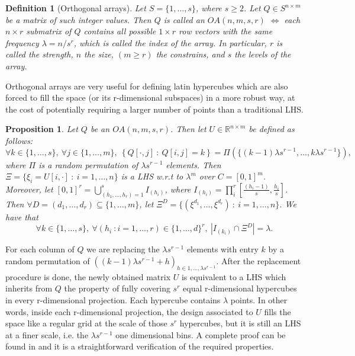 \documentclass{article}
\newtheorem{definition}[theorem]{Definition}
\newtheorem{proposition}[theorem]{Proposition}
\begin{document}
\begin{definition}[Orthogonal arrays]
Let $S=\{1,\dots,s\}$, where $s\ge 2$. Let $Q\in S^{n\times m}$ be a matrix of such integer values. Then $Q$ is called an $OA(n,m,s,r)$ $\Longleftrightarrow$ each $n\times r$ submatrix of $Q$ contains all possible $1\times r$ row vectors with the same frequency $\lambda=n/s^r$, which is called the index of the array. In particular, $r$ is called the strength, $n$ the size, $(m\ge r)$ the constrains, and $s$ the levels of the array.
\end{definition}

Orthogonal arrays are very useful for defining latin hypercubes which are also forced to fill the space (or its r-dimensional subspaces) in a more robust way, at the cost of potentially requiring a larger number of points than a traditional LHS.

\begin{proposition}
Let $Q$ be an $OA(n,m,s,r)$. Then let $U\in\mathbb R^{n\times m}$ be defined as follows:
$$\forall k\in \{1,\dots,s\},\ \forall j\in \{1,\dots,m\},\ \left\{Q[\cdot,j]\ :\ Q[i,j]=k\right\} = \Pi\left(\{(k-1)\lambda s^{r-1},\dots, k\lambda s^{r-1}\}\right),$$
where $\Pi$ is a random permutation of $\lambda s^{r-1}$ elements. Then $\Xi=\{\xi_i=U[i,\cdot]\ :\ i=1,\dots,n\}$ is a LHS w.r.t to $\lambda^m$ over $C=[0,1]^m$. Moreover, let $[0,1]^r=\bigcup_{(h_1,\dots,h_r)=1}^{s} I_{(h_i)}$, where $I_{(h_i)}=\prod^r_i[\frac{(h_i-1)}{s},\frac{h_i}{s}]$. Then $\forall D=(d_1,\dots,d_r)\subseteq \{1,\dots,m\}$, let $\Xi^D=\{(\xi^{d_1},\dots,\xi^{d_r})\ :\ i=1,\dots,n\}$. We have that
$$\forall k\in \{1,\dots,s\},\ \forall (h_i\ : i=1,\dots,r)\in\{1,\dots,d\}^r,\ \left|I_{(k_i)}\cap\Xi^D\right|=\lambda.$$
\end{proposition}

For each column of $Q$ we are replacing the $\lambda s^{r-1}$ elements with entry $k$ by a random permutation of $\left((k-1)\lambda s^{r-1} + h\right)_{h\in 1,\dots, \lambda s^{r-1}}$. After the replacement procedure is done, the newly obtained matrix $U$ is equivalent to a LHS which inherits from $Q$ the property of fully covering $s^r$ equal r-dimensional hypercubes in every r-dimensional projection. Each hypercube contains $\lambda$ points. In other words, inside each r-dimensional projection, the design associated to $U$ fills the space like a regular grid at the scale of those $s^r$ hypercubes, but it is still an LHS at a finer scale, i.e. the $\lambda s^{r-1}$ one dimensional bins. A complete proof can be found in \cite{Tang1993} and it is a straightforward verification of the required properties.
\end{document}
